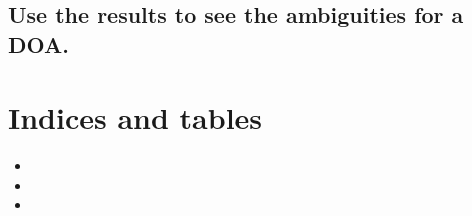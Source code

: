 \documentclass[letterpaper,10pt,english]{sphinxmanual}
\begin{document}
\section{Use the results to see the ambiguities for a DOA.}
\label{\detokenize{test_example:use-the-results-to-see-the-ambiguities-for-a-doa}}
\begin{figure}[htbp]
\centering

\noindent{}
\end{figure}

\begin{figure}[htbp]
\centering

\noindent{}
\end{figure}

\begin{figure}[htbp]
\centering

\noindent{}
\end{figure}

\begin{figure}[htbp]
\centering

\noindent{}
\end{figure}

\begin{figure}[htbp]
\centering

\noindent{}
\end{figure}

\begin{figure}[htbp]
\centering

\noindent{}
\end{figure}


\chapter{Indices and tables}
\label{\detokenize{index:indices-and-tables}}\begin{itemize}
\item {} 

\item {} 

\item {} 

\end{itemize}
\end{document}
